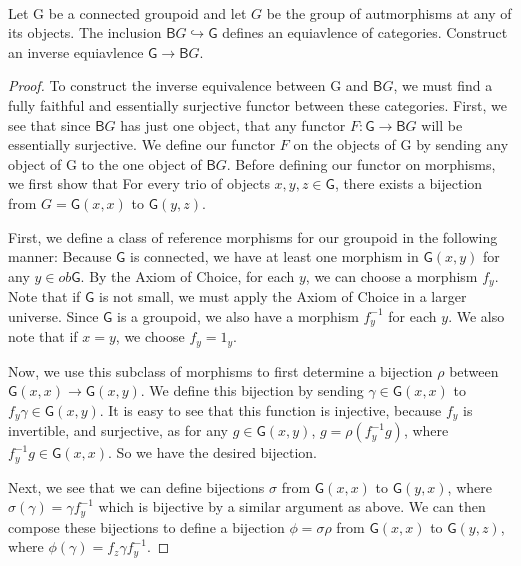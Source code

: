 \documentclass[main.tex]{subfiles}
\begin{document}
\paragraph{}
\begin{exercise}
	Let \textsf{G} be a connected groupoid and let $G$ be
	the group of autmorphisms at any of its objects. The inclusion $\textsf{B}G
	\hookrightarrow \textsf{G}$ defines an equiavlence of categories. Construct an
	inverse equiavlence $\textsf{G} \rightarrow \textsf{B}G$.
\end{exercise}
\begin{proof}
	To construct the inverse equivalence between  \textsf{G} and $\textsf{B}G$,
	we must find a fully faithful and essentially surjective functor between
	these categories. First, we see that since $\textsf{B}G$ has just one
	object, that any functor $F: \textsf{G} \rightarrow \textsf{B}G$ will be
	essentially surjective. We define our functor $F$ on the objects of
	\textsf{G} by sending any object of \textsf{G} to the one object of
	$\textsf{B}G$. Before defining our functor on morphisms, we first show that
	For every trio of objects $x,y,z \in \textsf{G}$, there exists a bijection
	from $G = \textsf{G}(x,x) $ to $\textsf{G}(y,z)$.

	First, we define a class of reference morphisms for our groupoid in the
	following manner: Because $\textsf{G}$ is connected, we have at least one
	morphism in $\textsf{G} (x,y)$ for any $y \in ob\textsf{G}$. By the Axiom of
	Choice, for each $y$, we can choose a morphism $f_y$. Note that if
	$\textsf{G}$ is not small, we must apply the Axiom of Choice in a larger
	universe. Since $\textsf{G}$ is a groupoid, we also have a morphism
	$f_y^{-1}$ for each $y$. We also note that if $x = y$, we choose $f_y =
	1_y$.

	Now, we use this subclass of morphisms to first determine a bijection $\rho$
	between $\textsf{G}(x,x) \rightarrow \textsf{G}(x,y)$. We define this
	bijection by sending $\gamma \in \textsf{G}(x,x)$ to $f_y\gamma \in
	\textsf{G}(x,y)$. It is easy to see that this function is injective, because
	$f_y$ is invertible, and surjective, as for any $g \in \textsf{G}(x,y)$, $g
	= \rho(f_y^{-1}g)$, where $f_y^{-1}g \in \textsf{G}(x,x)$. So we have the
	desired bijection.

	Next, we see that we can define bijections  $\sigma$ from $\textsf{G}(x,x)$
	to $\textsf{G}(y,x)$, where $\sigma(\gamma) = \gamma f_y^{-1}$ which is
	bijective by a similar argument as above. We can then compose these
	bijections to define a bijection $\phi = \sigma\rho$ from $\textsf{G}(x,x)$
	to $\textsf{G}(y,z)$, where $\phi(\gamma) = f_z\gamma f_y^{-1}$.


\end{proof}
\end{document}
